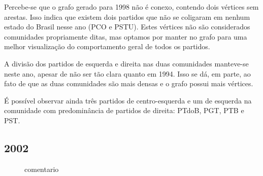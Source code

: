 Percebe-se que o grafo gerado para 1998 não é conexo, contendo dois vértices sem arestas. Isso indica que existem dois partidos que não se coligaram em nenhum estado do Brasil nesse ano (\gls{PCO} e \gls{PSTU}). Estes vértices não são considerados comunidades propriamente ditas, mas optamos por manter no grafo para uma melhor visualização do comportamento geral de todos os partidos.

A divisão dos partidos de esquerda e direita nas duas comunidades manteve-se neste ano, apesar de não ser tão clara quanto em 1994. Isso se dá, em parte, ao fato de que as duas comunidades são mais densas e o grafo possui mais vértices.

É possível observar ainda três partidos de centro-esquerda e um de esquerda na comunidade com predominância de partidos de direita: \gls{PTdoB}, \gls{PGT}, \gls{PTB} e \gls{PST}.


\subsection{2002}
\label{resultados__grafos--2002}

\begin{figure}[H]
\center
    \qquad

    \caption{comentario}
\end{figure}

